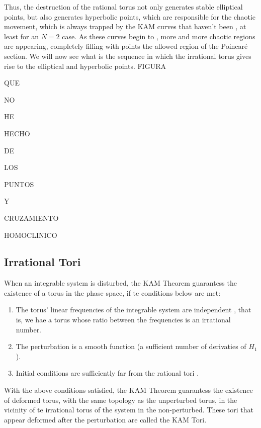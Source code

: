 Thus, the destruction of the rational torus not only generates stable elliptical points, but also generates hyperbolic points, which are responsible for the chaotic movement, which is always trapped by the KAM curves that haven't been  \cite{ott_chaos_2002}, at least for an $N=2$ case. As these curves begin to , more and more chaotic regions are appearing, completely filling with points the allowed region of the Poincaré section. We will now see what is the sequence in which the irrational torus gives rise to the elliptical and hyperbolic points.
FIGURA\par
QUE\par
NO\par
HE\par
HECHO\par
DE\par
LOS\par
PUNTOS\par
Y\par
CRUZAMIENTO\par
HOMOCLINICO\par





\subsection{Irrational Tori}
When an integrable system is disturbed, the KAM Theorem guarantess the existence of a torus in the phase space, if te conditions below are met:
\begin{enumerate}
\item The torus' linear frequencies of the integrable system are independent	 \cite{lichtenberg2013regular}, that is, we hae a torus whose ratio between the frequencies is an irrational number.
\item The perturbation is a smooth function \cite{lichtenberg2013regular} (a sufficient number of derivaties of $H_1$).
\item Initial conditions are sufficiently far from the rational tori \cite{lichtenberg2013regular}.
\end{enumerate}
With the above conditions satisfied, the KAM Theorem guarantess the existence of deformed torus, with the same topology as the unperturbed torus, in the vicinity of te irrational torus of the system in the non-perturbed. These tori that appear deformed after the perturbation are called the KAM Tori.\par

